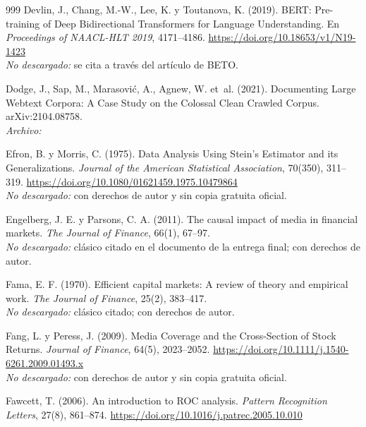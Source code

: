 \begin{thebibliography}{999}
Devlin, J., Chang, M.-W., Lee, K. y Toutanova, K. (2019). {BERT}: Pre-training of Deep Bidirectional Transformers for Language Understanding. En \emph{Proceedings of NAACL-HLT 2019}, 4171--4186. \url{https://doi.org/10.18653/v1/N19-1423}
\\\textit{No descargado:} se cita a través del artículo de BETO.

Dodge, J., Sap, M., Marasovi{\'c}, A., Agnew, W. et~al. (2021). Documenting Large Webtext Corpora: A Case Study on the Colossal Clean Crawled Corpus. arXiv:2104.08758.
\\\textit{Archivo:} 

Efron, B. y Morris, C. (1975). Data Analysis Using {Stein}'s Estimator and its Generalizations. \emph{Journal of the American Statistical Association}, 70(350), 311--319. \url{https://doi.org/10.1080/01621459.1975.10479864}
\\\textit{No descargado:} con derechos de autor y sin copia gratuita oficial.

Engelberg, J. E. y Parsons, C. A. (2011). The causal impact of media in financial markets. \emph{The Journal of Finance}, 66(1), 67--97.
\\\textit{No descargado:} clásico citado en el documento de la entrega final; con derechos de autor.

Fama, E. F. (1970). Efficient capital markets: A review of theory and empirical work. \emph{The Journal of Finance}, 25(2), 383--417.
\\\textit{No descargado:} clásico citado; con derechos de autor.

Fang, L. y Peress, J. (2009). Media Coverage and the Cross-Section of Stock Returns. \emph{Journal of Finance}, 64(5), 2023--2052. \url{https://doi.org/10.1111/j.1540-6261.2009.01493.x}
\\\textit{No descargado:} con derechos de autor y sin copia gratuita oficial.

Fawcett, T. (2006). An introduction to ROC analysis. \textit{Pattern Recognition Letters}, 27(8), 861--874. \url{https://doi.org/10.1016/j.patrec.2005.10.010}


\end{thebibliography}
